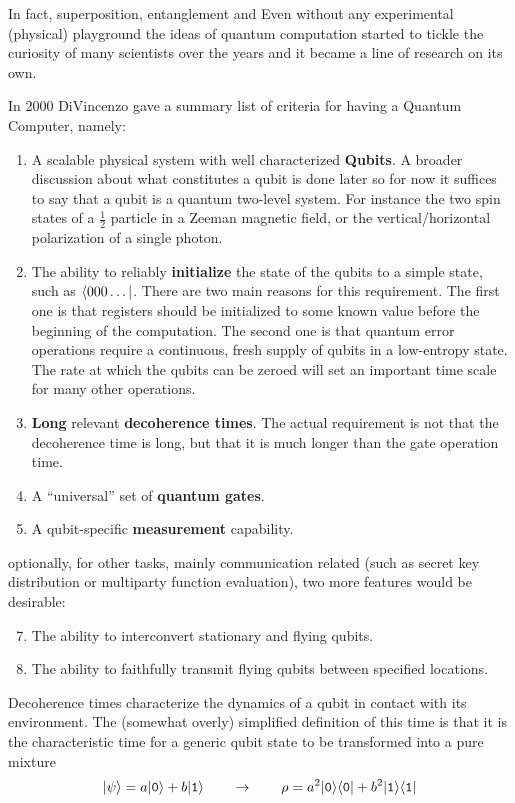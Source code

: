 In fact, superposition, entanglement and %
Even without any experimental (physical) playground the ideas of quantum computation started to tickle the curiosity of many scientists over the years and it became a line of research on its own. %

In 2000 DiVincenzo gave a summary list of criteria for having a Quantum Computer\cite{DiVincenzo2000}, namely:
\begin{enumerate}
  \item A scalable physical system with well characterized \textbf{Qubits}. A broader discussion about what constitutes a qubit is done later so for now it suffices to say that a qubit is a quantum two-level system. For instance the two spin states of a $\tfrac{1}{2}$ particle in a Zeeman magnetic field, or the vertical/horizontal polarization of a single photon.
  \item The ability to reliably \textbf{initialize} the state of the qubits to a simple state, such as $\langle000\dots|$. There are two main reasons for this requirement. The first one is that registers should be initialized to some known value before the beginning of the computation. The second one is that quantum error operations require a continuous, fresh supply of qubits in a low-entropy state. The rate at which the qubits can be zeroed will set an important time scale for many other operations.
  \item \textbf{Long} relevant \textbf{decoherence times}. The actual requirement is not that the decoherence time is long, but that it is much longer than the gate operation time.
  \item A ``universal'' set of \textbf{quantum gates}.\cite{Deutsch1985,Deutsch1989}
  \item A qubit-specific \textbf{measurement} capability.
\end{enumerate}
optionally, for other tasks, mainly communication related (such as secret key distribution or multiparty function evaluation)\cite{DiVincenzo1999}, two more features would be desirable:
\begin{enumerate}
  \setcounter{enumi}{6}
  \item The ability to interconvert stationary and flying qubits\cite{Turchette1995,Imamoglu1999}.
  \item The ability to faithfully transmit flying qubits between specified locations.
\end{enumerate}


Decoherence times characterize the dynamics of a qubit in contact with its environment. The (somewhat overly) simplified definition of this time is that it is the characteristic time for a generic qubit state
to be transformed into a pure mixture
\begin{equation}
  |\psi\rangle=a|\texttt{0}\rangle+b|\texttt{1}\rangle \qquad\rightarrow\qquad
  \rho = a^2|\texttt{0}\rangle\langle\texttt{0}| + b^2|\texttt{1}\rangle\langle\texttt{1}|
\end{equation}









